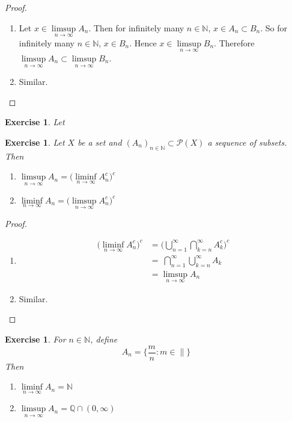 \documentclass[12pt]{amsart}
\newtheorem{ex}[thm]{Exercise}
\newcommand{\N}{\mathbb{N}}
\newcommand{\Q}{\mathbb{Q}}
\newcommand{\MP}{\mathcal{P}}
\begin{document}
	\begin{proof}\
		\begin{enumerate}
			\item Let $x \in \limsup\limits_{n \rightarrow \infty}A_n$. Then for infinitely many $n \in \N$, $x \in A_n \subset B_n$. So for infinitely many $n \in \N$, $x \in B_n$. Hence $x \in \limsup\limits_{n \rightarrow \infty}B_n$. Therefore $\limsup\limits_{n \rightarrow \infty}A_n \subset \limsup\limits_{n \rightarrow \infty}B_n$.
			\item Similar.
		\end{enumerate}
	\end{proof}
	
	\begin{ex}
		Let 
	\end{ex}
	
	\begin{ex}
		Let $X$ be a set and $(A_n)_{n \in \N} \subset \MP(X)$ a sequence of subsets. Then 
		\begin{enumerate}
			\item $\limsup\limits_{n \rightarrow \infty}A_n = \bigg(\liminf\limits_{n \rightarrow \infty}A_n^c \bigg)^c$
			\item $\liminf\limits_{n \rightarrow \infty}A_n = \bigg(\limsup\limits_{n \rightarrow \infty}A_n^c \bigg)^c$
		\end{enumerate}
	\end{ex}
	
	\begin{proof}\
		\begin{enumerate}
			\item \begin{align*}
				\bigg( \liminf\limits_{n \rightarrow \infty}A_n^c \bigg)^c 
				&= \bigg( \bigcup\limits_{n=1}^{\infty} \bigcap\limits_{k=n}^{\infty}A_k^c \bigg)^c\\
				&= \ \bigcap\limits_{n=1}^{\infty}\bigcup\limits_{k=n}^{\infty}A_k  \\
				&=  \limsup\limits_{n \rightarrow \infty}A_n
			\end{align*}
			\item Similar.
		\end{enumerate}
	\end{proof}
	
	\begin{ex}
		For $n \in \N$, define $$A_n = \bigg\{ \frac{m}{n}: m \in \|\bigg\}$$ 
		Then
		\begin{enumerate}
			\item $\liminf\limits_{n \rightarrow \infty }A_n = \N$ 
			\item $\limsup\limits_{n \rightarrow \infty }A_n = \Q \cap (0,\infty )$
		\end{enumerate}
	\end{ex}
	
\end{document}
